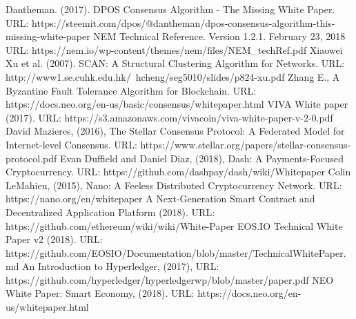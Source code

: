 \documentclass[a4paper,12pt]{article}
\begin{document}
\begin{thebibliography}{99}
  Dantheman. (2017). DPOS Consensus Algorithm - The Missing White Paper. URL: https://steemit.com/dpos/@dantheman/dpos-consensus-algorithm-this-missing-white-paper
  NEM Technical Reference. Version 1.2.1. February 23, 2018 URL: https://nem.io/wp-content/themes/nem/files/NEM\_techRef.pdf
 Xiaowei Xu et al. (2007). SCAN: A Structural Clustering Algorithm for Networks. URL: http://www1.se.cuhk.edu.hk/~hcheng/seg5010/slides/p824-xu.pdf
 Zhang E., A Byzantine Fault Tolerance Algorithm for Blockchain. URL: https://docs.neo.org/en-us/basic/consensus/whitepaper.html
 VIVA White paper (2017). URL: https://s3.amazonaws.com/vivacoin/viva-white-paper-v-2-0.pdf
 David Mazieres, (2016), The Stellar Consensus Protocol: A Federated Model for Internet-level Consensus. URL: https://www.stellar.org/papers/stellar-consensus-protocol.pdf
 Evan Duffield and Daniel Diaz, (2018), Dash: A Payments-Focused Cryptocurrency. URL: https://github.com/dashpay/dash/wiki/Whitepaper
 Colin LeMahieu, (2015), Nano: A Feeless Distributed Cryptocurrency Network. URL: https://nano.org/en/whitepaper
 A Next-Generation Smart Contract and Decentralized Application Platform (2018). URL: https://github.com/ethereum/wiki/wiki/White-Paper
 EOS.IO Technical White Paper v2 (2018). URL: https://github.com/EOSIO/Documentation/blob/master/TechnicalWhitePaper.md
 An Introduction to Hyperledger, (2017), URL: https://github.com/hyperledger/hyperledgerwp/blob/master/paper.pdf
 NEO White Paper: Smart Economy, (2018). URL: https://docs.neo.org/en-us/whitepaper.html
\end{thebibliography}
\end{document}
